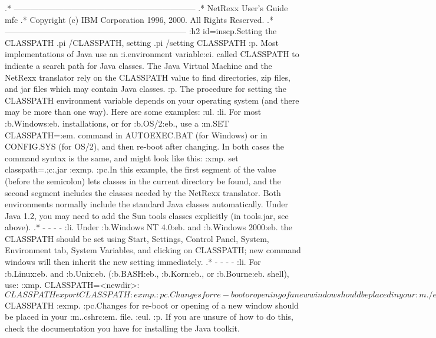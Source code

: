 .* ------------------------------------------------------------------
.* NetRexx User's Guide                                              mfc
.* Copyright (c) IBM Corporation 1996, 2000.  All Rights Reserved.
.* ------------------------------------------------------------------
:h2 id=inscp.Setting the CLASSPATH
.pi /CLASSPATH, setting
.pi /setting CLASSPATH
:p.
Most implementations of Java use an :i.environment variable:ei. called
CLASSPATH to indicate a search path for Java classes.  The Java Virtual
Machine and the NetRexx translator rely on the CLASSPATH value to find
directories, zip files, and jar files which may contain Java classes.
:p.
The procedure for setting the CLASSPATH environment variable depends on
your operating system (and there may be more than one way).  Here are
some examples:
:ul.
:li.
For most :b.Windows:eb. installations, or for :b.OS/2:eb., use a :m.SET
CLASSPATH=:em. command in AUTOEXEC.BAT (for Windows) or in CONFIG.SYS
(for OS/2), and then re-boot after changing.  In both cases the command
syntax is the same, and might look like this:
:xmp.
set classpath=.;c:\lib\NetRexxC.jar
:exmp.
:pc.In this example, the first segment of the value (before the semicolon)
lets classes in the current directory be found, and the second segment
includes the classes needed by the NetRexx translator.  Both
environments normally include the standard Java classes automatically.
Under Java 1.2, you may need to add the Sun tools classes explicitly (in
tools.jar, see above).
.* - - - -
:li.
Under :b.Windows NT 4.0:eb. and :b.Windows 2000:eb. the CLASSPATH should
be set using Start, Settings, Control Panel, System, Environment tab,
System Variables, and clicking on CLASSPATH; new command windows will
then inherit the new setting immediately.
.* - - - -
:li.
For :b.Linux:eb. and :b.Unix:eb. (:b.BASH:eb., :b.Korn:eb., or
:b.Bourne:eb. shell), use:
:xmp.
CLASSPATH=<newdir>:$CLASSPATH
export CLASSPATH
:exmp.
:pc.Changes for re-boot or opening of a new window should be placed
in your :m./etc/profile:em., :m..login:em., or :m..profile:em. file, as
appropriate.
.* - - - -
:li.
For :b.Linux:eb. and :b.Unix:eb.
(:b.C:eb. shell), use:
:xmp.
setenv CLASSPATH <newdir>:$CLASSPATH
:exmp.
:pc.Changes for re-boot or opening of a new window should be
placed in your :m..cshrc:em. file.
:eul.
:p.
If you are unsure of how to do this, check the documentation you have
for installing the Java toolkit.
